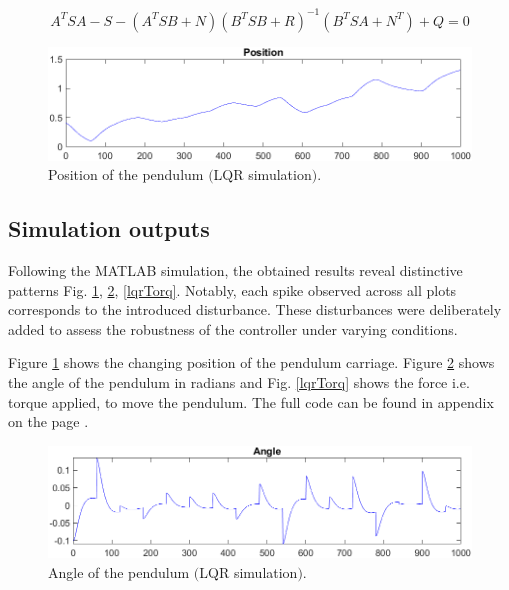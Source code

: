 \begin{equation}\label{eq4}
A^TSA-S-(A^TSB+N)(B^TSB+R)^{-1}(B^TSA+N^T)+Q=0
\end{equation}

\begin{figure}[!tbh]
	\centering
	\includegraphics[width=130mm]{obr/position.png}
	\caption{Position of the pendulum $($LQR simulation$)$.}\label{lqrpos}
\end{figure}

\newpage
\subsection*{Simulation outputs}
Following the MATLAB simulation, the obtained results reveal distinctive patterns Fig. \ref{lqrpos}, \ref{lqrang}, \ref{lqrTorq}. Notably, each spike observed across all plots corresponds to the introduced disturbance. These disturbances were deliberately added to assess the robustness of the controller under varying conditions.

Figure \ref{lqrpos} shows the changing position of the pendulum carriage. Figure \ref{lqrang} shows the angle of the pendulum in radians and Fig. \ref{lqrTorq} shows the force i.e. torque applied, to move the pendulum. The full code can be found in appendix on the page \pageref{lqrSim.m}.



\begin{figure}[!tbh]
	\centering
	\includegraphics[width=130mm]{obr/lqrangle.png}
	\caption{Angle of the pendulum $($LQR simulation$)$.}\label{lqrang}
\end{figure}

